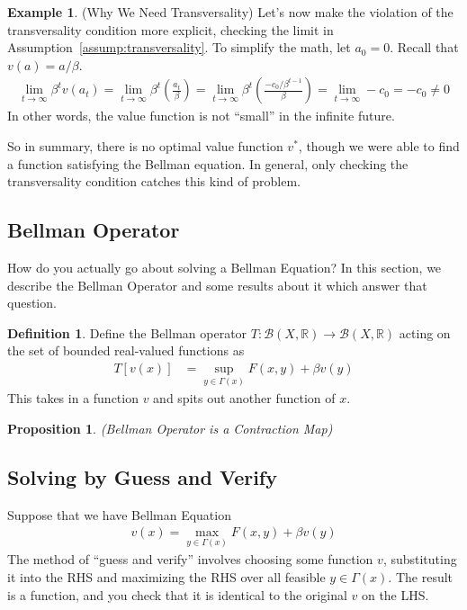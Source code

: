 \documentclass[12pt]{article}
\numberwithin{equation}{section} %
\theoremstyle{plain}
\newtheorem{prop}[thm]{Proposition}
\theoremstyle{definition}
\newtheorem{defn}[thm]{Definition}
\newtheorem{ex}[thm]{Example}
\theoremstyle{remark}
\newcommand{\R}{\mathbb{R}}
\begin{document}
\begin{ex}{(Why We Need Transversality)}
Let's now make the violation of the transversality condition more
explicit, checking the limit in Assumption~\ref{assump:transversality}.
To simplify the math, let $a_0=0$. Recall that $v(a) = a/\beta$.
\begin{align*}
  \lim_{t\rightarrow\infty} \beta^t v(a_t)
  = \lim_{t\rightarrow\infty} \beta^t \left(\frac{a_t}{\beta}\right)
  = \lim_{t\rightarrow\infty} \beta^t
  \left(
  \frac{-c_0/\beta^{t-1}}{\beta}
  \right)
  = \lim_{t\rightarrow\infty}
  -c_0
  = -c_0 \neq 0
\end{align*}
In other words, the value function is not ``small'' in the infinite
future.

So in summary, there is no optimal value function $v^*$, though we were
able to find a function satisfying the Bellman equation. In general,
only checking the transversality condition catches this kind of problem.
\end{ex}


\subsection{Bellman Operator}

How do you actually go about solving a Bellman Equation? In this
section, we describe the Bellman Operator and some results about it
which answer that question.

\begin{defn}
Define the Bellman operator
$T:\mathscr{B}(X,\R)\rightarrow\mathscr{B}(X,\R)$
acting on the set of bounded real-valued functions as
\begin{align*}
  T[v(x)]
  &= \sup_{y\in\Gamma(x)}
  F(x,y) + \beta v(y)
\end{align*}
This takes in a function $v$ and spits out another function of $x$.
\end{defn}

\begin{prop}{\emph{(Bellman Operator is a Contraction Map)}}
\end{prop}


\subsection{Solving by Guess and Verify}

Suppose that we have Bellman Equation
\begin{align*}
  v(x) = \max_{y\in\Gamma(x)} F(x,y) + \beta v(y)
\end{align*}
The method of ``guess and verify'' involves choosing some function $v$,
substituting it into the RHS and maximizing the RHS over all feasible
$y\in\Gamma(x)$. The result is a function, and you check that it is
identical to the original $v$ on the LHS.
\end{document}
